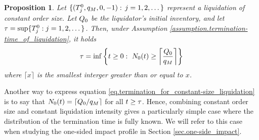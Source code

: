 \documentclass[10pt]{article}
\newtheorem{prop}[thm]{Proposition}
\begin{document}
\begin{prop}\label{prop.termination_for_constant-size_liquidation}
 Let $\lbrace (\arrivalTimes[0]_j, q_{M}, 0, -1): \, j=1,2,\dots\rbrace$ represent a liquidation of constant order size. Let $\metaorderSize$ be the liquidator's initial inventory, and let $\terminationTime = \sup\lbrace \arrivalTimes[0]_j : j=1,2,\dots\rbrace$. Then, under Assumption \ref{assumption.termination-time_of_liquidation}, it holds
 \begin{equation}\label{eq.termination_for_constant-size_liquidation}
 \terminationTime = \inf \left\lbrace t\geq 0: \, \, \countingProc[0](t)\geq 
 \left\lceil \frac{\metaorderSize}{q_{M}}\right\rceil \right\rbrace
 \end{equation}
 where $\lceil x\rceil$ is the smallest interger greater than or equal to $x$. 
\end{prop}

Another way to express equation \eqref{eq.termination_for_constant-size_liquidation} is to say that $\countingProc[0](t) = \lceil\metaorderSize/q_{M}\rceil$ for all $t\geq \terminationTime$.
Hence, combining constant order size and constant liquidation intensity gives a particularly simple case where the distribution of the termination time is fully known. We will refer to this case when studying the one-sided impact profile in Section \ref{sec.one-side_impact}.
\end{document}
